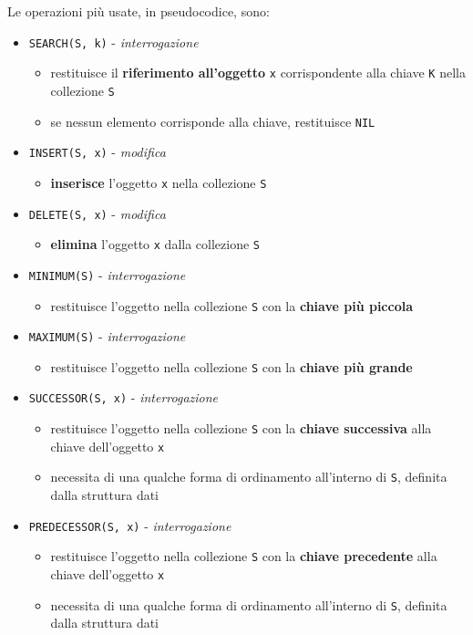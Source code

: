 \documentclass[italian, 10pt]{article}
\begin{document}
\bigskip
Le operazioni più usate, in pseudocodice, sono:

\begin{itemize}
  \item \texttt{SEARCH(S, k)} - \textit{interrogazione}
        \begin{itemize}
          \item restituisce il \textbf{riferimento all'oggetto} \texttt{x} corrispondente alla chiave \texttt{K} nella collezione \texttt{S}
          \item se nessun elemento corrisponde alla chiave, restituisce \texttt{NIL}
        \end{itemize}
  \item \texttt{INSERT(S, x)} - \textit{modifica}
        \begin{itemize}
          \item \textbf{inserisce} l'oggetto \texttt{x} nella collezione \texttt{S}
        \end{itemize}
  \item \texttt{DELETE(S, x)} - \textit{modifica}
        \begin{itemize}
          \item \textbf{elimina} l'oggetto \texttt{x} dalla collezione \texttt{S}
        \end{itemize}
  \item \texttt{MINIMUM(S)} - \textit{interrogazione}
        \begin{itemize}
          \item restituisce l'oggetto nella collezione \texttt{S} con la \textbf{chiave più piccola}
        \end{itemize}
  \item \texttt{MAXIMUM(S)} - \textit{interrogazione}
        \begin{itemize}
          \item restituisce l'oggetto nella collezione \texttt{S} con la \textbf{chiave più grande}
        \end{itemize}
  \item \texttt{SUCCESSOR(S, x)} - \textit{interrogazione}
        \begin{itemize}
          \item restituisce l'oggetto nella collezione \texttt{S} con la \textbf{chiave successiva} alla chiave dell'oggetto \texttt{x}
          \item necessita di una qualche forma di ordinamento all'interno di \texttt{S}, definita dalla struttura dati
        \end{itemize}
  \item \texttt{PREDECESSOR(S, x)} - \textit{interrogazione}
        \begin{itemize}
          \item restituisce l'oggetto nella collezione \texttt{S} con la \textbf{chiave precedente} alla chiave dell'oggetto \texttt{x}
          \item necessita di una qualche forma di ordinamento all'interno di \texttt{S}, definita dalla struttura dati
        \end{itemize}
\end{itemize}
\end{document}
